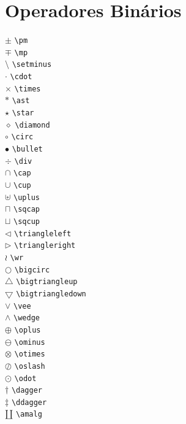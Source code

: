 \documentclass{fei}
\begin{document}
\section{Operadores Binários}
\begin{multicols}{3}
\noindent
\(\pm\) \verb+\pm+\\
\(\mp\) \verb+\mp+\\
\(\setminus\) \verb+\setminus+\\
\(\cdot\) \verb+\cdot+\\
\(\times\) \verb+\times+\\
\(\ast\) \verb+\ast+\\
\(\star\) \verb+\star+\\
\(\diamond\) \verb+\diamond+\\
\(\circ\) \verb+\circ+\\
\(\bullet\) \verb+\bullet+\\
\(\div\) \verb+\div+\\
\(\cap\) \verb+\cap+\\
\(\cup\) \verb+\cup+\\
\(\uplus\) \verb+\uplus+\\
\(\sqcap\) \verb+\sqcap+\\
\(\sqcup\) \verb+\sqcup+\\
\(\triangleleft\) \verb+\triangleleft+\\
\(\triangleright\) \verb+\triangleright+\\
\(\wr\) \verb+\wr+\\
\(\bigcirc\) \verb+\bigcirc+\\
\(\bigtriangleup\) \verb+\bigtriangleup+\\
\(\bigtriangledown\) \verb+\bigtriangledown+\\
\(\vee\) \verb+\vee+\\
\(\wedge\) \verb+\wedge+\\
\(\oplus\) \verb+\oplus+\\
\(\ominus\) \verb+\ominus+\\
\(\otimes\) \verb+\otimes+\\
\(\oslash\) \verb+\oslash+\\
\(\odot\) \verb+\odot+\\
\(\dagger\) \verb+\dagger+\\
\(\ddagger\) \verb+\ddagger+\\
\(\amalg\) \verb+\amalg+\\
\end{multicols}
\end{document}
